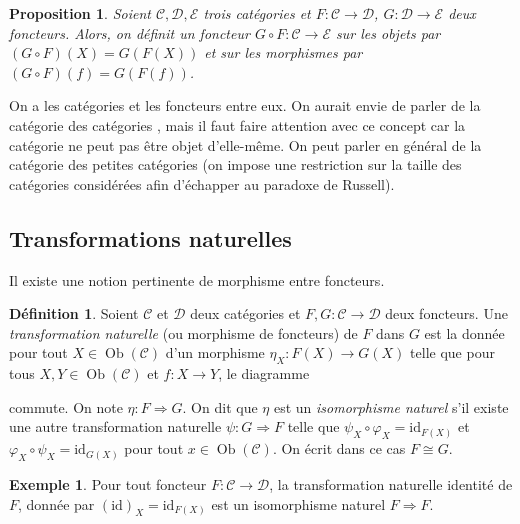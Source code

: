 \documentclass{article}
\newcommand{\id}{\mathrm{id}}
\newcommand{\cat}{\mathcal{C}}
\newcommand{\catt}{\mathcal{D}}
\DeclareMathOperator{\Ob}{Ob}
\theoremstyle{plain}
\newtheorem{proposition}[theorem]{Proposition}
\theoremstyle{definition}
\newtheorem{definition}[theorem]{Définition}
\newtheorem{example}[theorem]{Exemple}
\theoremstyle{remark}
\begin{document}
\begin{proposition}
    Soient $\cat,\catt,\mathcal{E}$ trois catégories et $F : \cat \to \catt$, $G : \catt \to \mathcal{E}$ deux foncteurs. Alors, on définit un foncteur $G \circ F : \cat \to \mathcal{E}$ sur les objets par $(G\circ F)(X) = G(F(X))$ et sur les morphismes par $(G\circ F)(f) = G(F(f))$.
\end{proposition}

On a les catégories et les foncteurs entre eux. On aurait envie de parler de la \og catégorie des catégories \fg, mais il faut faire attention avec ce concept car la catégorie ne peut pas être objet d'elle-même. On peut parler en général de la catégorie des \og petites \fg catégories (on impose une restriction sur la taille des catégories considérées afin d'échapper au paradoxe de Russell).

\subsection{Transformations naturelles}

Il existe une notion pertinente de morphisme entre foncteurs.

\begin{definition}
    Soient $\cat$ et $\catt$ deux catégories et $F,G : \cat \to \catt$ deux foncteurs. Une \emph{transformation naturelle} (ou morphisme de foncteurs) de $F$ dans $G$ est la donnée pour tout $X \in \Ob(\cat)$ d'un morphisme $\eta_X : F(X) \to G(X)$ telle que pour tous $X, Y\in \Ob(\cat)$ et $f : X \to Y$, le diagramme
    \begin{center}
    \end{center}
    commute. On note $\eta : F \Rightarrow G$. On dit que $\eta$ est un \emph{isomorphisme naturel} s'il existe une autre transformation naturelle $\psi : G\Rightarrow F$ telle que $\psi_X \circ \varphi_X = \id_{F(X)}$ et $\varphi_X \circ \psi_X = \id_{G(X)}$ pour tout $x \in \Ob(\cat)$. On écrit dans ce cas $F \cong G$.
\end{definition}

\begin{example}
    Pour tout foncteur $F : \cat \to \catt$, la transformation naturelle identité de $F$, donnée par $(\id)_X = \id_{F(X)}$ est un isomorphisme naturel $F \Rightarrow F$.
\end{example}
\end{document}
